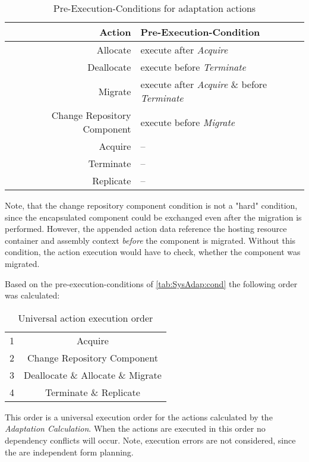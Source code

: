 \begin{table}[h]
	\centering
	\begin{tabular}{r | l}
		\hline
		\textbf{Action} & \textbf{Pre-Execution-Condition} \\
		\hline
		Allocate & execute after \textit{Acquire} \\
		Deallocate & execute before \textit{Terminate} \\
		Migrate & execute after \textit{Acquire} \& before \textit{Terminate} \\
		Change Repository Component & execute before \textit{Migrate} \\
		Acquire & -- \\
		Terminate & -- \\
		Replicate & -- \\
		\hline
	\end{tabular}
	\caption{Pre-Execution-Conditions for adaptation actions}
	\label{tab:SysAdap:cond}
\end{table}

Note, that the change repository component condition is not a "hard" condition, since the encapsulated component could be exchanged even after the migration is performed. However, the appended action data reference the hosting resource container and assembly context \textit{before} the component is migrated. Without this condition, the action execution would have to check, whether the component was migrated.

Based on the pre-execution-conditions of \autoref{tab:SysAdap:cond} the following order was calculated:

\begin{table}[h]
	\centering
	\begin{tabular}{ r | c}
		\hline
		1 & Acquire\\
		2 & Change Repository Component\\
		3 & Deallocate \& Allocate \& Migrate \\
		4 & Terminate \& Replicate\\
		\hline
	\end{tabular}
	\caption{Universal action execution order}
	\label{tab:SysAdap:order}
\end{table}

This order is a universal execution order for the actions calculated by the \textit{Adaptation Calculation}. When the actions are executed in this order no dependency conflicts will occur. Note, execution errors are not considered, since the are independent form planning.


